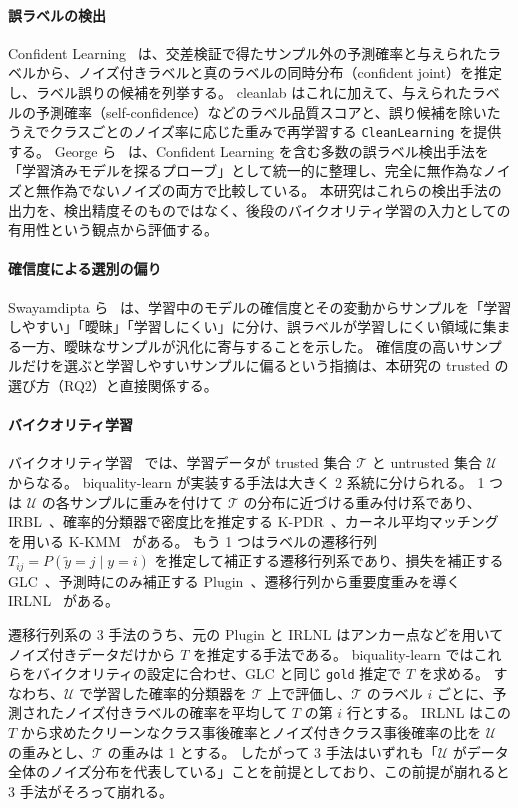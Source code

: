 \documentclass[a4paper,10pt]{ltjsarticle}
\newcommand{\cl}{\textsf{cleanlab}}
\newcommand{\bq}{\textsf{biquality-learn}}
\begin{document}
\paragraph{誤ラベルの検出}
Confident Learning~\cite{northcutt2021confident} は、交差検証で得たサンプル外の予測確率と与えられたラベルから、ノイズ付きラベルと真のラベルの同時分布（confident joint）を推定し、ラベル誤りの候補を列挙する。
\cl{} はこれに加えて、与えられたラベルの予測確率（self-confidence）などのラベル品質スコアと、誤り候補を除いたうえでクラスごとのノイズ率に応じた重みで再学習する \texttt{CleanLearning} を提供する。
George ら~\cite{george2024probing} は、Confident Learning を含む多数の誤ラベル検出手法を「学習済みモデルを探るプローブ」として統一的に整理し、完全に無作為なノイズと無作為でないノイズの両方で比較している。
本研究はこれらの検出手法の出力を、検出精度そのものではなく、後段のバイクオリティ学習の入力としての有用性という観点から評価する。

\paragraph{確信度による選別の偏り}
Swayamdipta ら~\cite{swayamdipta2020cartography} は、学習中のモデルの確信度とその変動からサンプルを「学習しやすい」「曖昧」「学習しにくい」に分け、誤ラベルが学習しにくい領域に集まる一方、曖昧なサンプルが汎化に寄与することを示した。
確信度の高いサンプルだけを選ぶと学習しやすいサンプルに偏るという指摘は、本研究の trusted の選び方（RQ2）と直接関係する。

\paragraph{バイクオリティ学習}
バイクオリティ学習~\cite{nodet2023framework} では、学習データが trusted 集合 $\mathcal{T}$ と untrusted 集合 $\mathcal{U}$ からなる。
\bq{} が実装する手法は大きく 2 系統に分けられる。
1 つは $\mathcal{U}$ の各サンプルに重みを付けて $\mathcal{T}$ の分布に近づける重み付け系であり、IRBL~\cite{nodet2021irbl}、確率的分類器で密度比を推定する K-PDR~\cite{bickel2007discriminative,nodet2023framework}、カーネル平均マッチングを用いる K-KMM~\cite{huang2006kmm,nodet2023framework} がある。
もう 1 つはラベルの遷移行列 $T_{ij} = P(\tilde{y}=j \mid y=i)$ を推定して補正する遷移行列系であり、損失を補正する GLC~\cite{hendrycks2018glc}、予測時にのみ補正する Plugin~\cite{zhang2021plugin}、遷移行列から重要度重みを導く IRLNL~\cite{liu2016irlnl} がある。

遷移行列系の 3 手法のうち、元の Plugin と IRLNL はアンカー点などを用いてノイズ付きデータだけから $T$ を推定する手法である。
\bq{} ではこれらをバイクオリティの設定に合わせ、GLC と同じ \texttt{gold} 推定で $T$ を求める。
すなわち、$\mathcal{U}$ で学習した確率的分類器を $\mathcal{T}$ 上で評価し、$\mathcal{T}$ のラベル $i$ ごとに、予測されたノイズ付きラベルの確率を平均して $T$ の第 $i$ 行とする。
IRLNL はこの $T$ から求めたクリーンなクラス事後確率とノイズ付きクラス事後確率の比を $\mathcal{U}$ の重みとし、$\mathcal{T}$ の重みは 1 とする。
したがって 3 手法はいずれも「$\mathcal{U}$ がデータ全体のノイズ分布を代表している」ことを前提としており、この前提が崩れると 3 手法がそろって崩れる。
\end{document}

